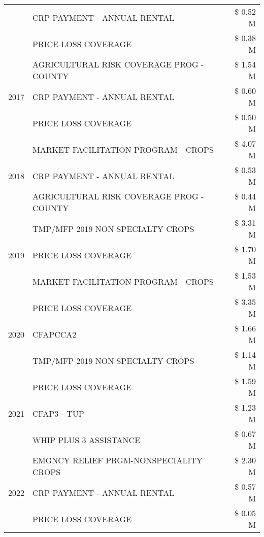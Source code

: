 \begin{tabular}{llr}
 & CRP PAYMENT - ANNUAL RENTAL & \$ 0.52 M \\
 & PRICE LOSS COVERAGE & \$ 0.38 M \\
\cline{1-3}
\multirow[t]{3}{*}{2017} & AGRICULTURAL RISK COVERAGE PROG - COUNTY & \$ 1.54 M \\
 & CRP PAYMENT - ANNUAL RENTAL & \$ 0.60 M \\
 & PRICE LOSS COVERAGE & \$ 0.50 M \\
\cline{1-3}
\multirow[t]{3}{*}{2018} & MARKET FACILITATION PROGRAM - CROPS & \$ 4.07 M \\
 & CRP PAYMENT - ANNUAL RENTAL & \$ 0.53 M \\
 & AGRICULTURAL RISK COVERAGE PROG - COUNTY & \$ 0.44 M \\
\cline{1-3}
\multirow[t]{3}{*}{2019} & TMP/MFP 2019 NON SPECIALTY CROPS & \$ 3.31 M \\
 & PRICE LOSS COVERAGE & \$ 1.70 M \\
 & MARKET FACILITATION PROGRAM - CROPS & \$ 1.53 M \\
\cline{1-3}
\multirow[t]{3}{*}{2020} & PRICE LOSS COVERAGE & \$ 3.35 M \\
 & CFAPCCA2 & \$ 1.66 M \\
 & TMP/MFP 2019 NON SPECIALTY CROPS & \$ 1.14 M \\
\cline{1-3}
\multirow[t]{3}{*}{2021} & PRICE LOSS COVERAGE & \$ 1.59 M \\
 & CFAP3 - TUP & \$ 1.23 M \\
 & WHIP PLUS 3 ASSISTANCE & \$ 0.67 M \\
\cline{1-3}
\multirow[t]{3}{*}{2022} & EMGNCY RELIEF PRGM-NONSPECIALITY CROPS & \$ 2.30 M \\
 & CRP PAYMENT - ANNUAL RENTAL & \$ 0.57 M \\
 & PRICE LOSS COVERAGE & \$ 0.05 M \\
\cline{1-3}
\bottomrule
\end{tabular}
